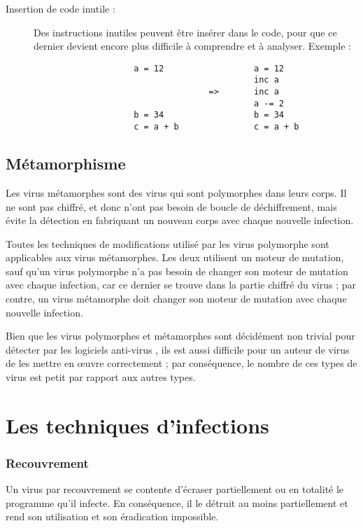 \begin{description}
            \item[Insertion de code inutile :] Des instructions inutiles peuvent être insérer dans le code, pour que 
                ce dernier devient encore plus  difficile à comprendre et à analyser. Exemple :
                \begin{verbatim}
                    a = 12                  a = 12
                                            inc a
                                   =>       inc a
                                            a -= 2
                    b = 34                  b = 34
                    c = a + b               c = a + b
                \end{verbatim}
        \end{description}

    \subsection{Métamorphisme}
    Les virus métamorphes sont des virus qui sont polymorphes dans leurs corps. Il ne sont pas chiffré, et donc n'ont
    pas besoin de boucle de déchiffrement, mais évite la détection en fabriquant un nouveau corps avec chaque 
    nouvelle infection.

    Toutes les techniques de modifications utilisé par les virus polymorphe sont applicables aux virus métamorphes. 
    Les deux utilisent un moteur de mutation, sauf qu'un virus polymorphe n'a pas besoin de changer son moteur de 
    mutation avec chaque infection, car ce dernier se trouve dans la partie chiffré du virus ; par contre,
    un virus métamorphe doit changer son moteur de mutation avec chaque nouvelle infection.

    Bien que les virus polymorphes et métamorphes sont décidément non trivial pour détecter par les logiciels anti-virus
    , ils est aussi difficile pour un auteur de virus de les mettre en œuvre correctement ; par conséquence, 
    le nombre de ces types de virus est petit par rapport aux autres types.

\section{Les techniques d'infections}
        \subsubsection{Recouvrement}
        Un virus par recouvrement se contente d’écraser partiellement ou en totalité le programme 
        qu’il infecte. En conséquence, il le détruit au moins partiellement et rend son utilisation et 
        son éradication impossible.

